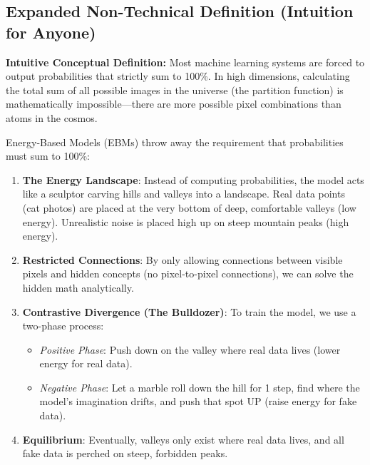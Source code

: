 \documentclass[11pt,a4paper]{article}
\theoremstyle{definition}
\begin{document}
\subsection{Expanded Non-Technical Definition (Intuition for Anyone)}
\textbf{Intuitive Conceptual Definition:}
Most machine learning systems are forced to output probabilities that strictly sum to 100\%. In high dimensions, calculating the total sum of all possible images in the universe (the partition function) is mathematically impossible—there are more possible pixel combinations than atoms in the cosmos.

Energy-Based Models (EBMs) throw away the requirement that probabilities must sum to 100\%:
\begin{enumerate}
    \item \textbf{The Energy Landscape}: Instead of computing probabilities, the model acts like a sculptor carving hills and valleys into a landscape. Real data points (cat photos) are placed at the very bottom of deep, comfortable valleys (low energy). Unrealistic noise is placed high up on steep mountain peaks (high energy).
    \item \textbf{Restricted Connections}: By only allowing connections between visible pixels and hidden concepts (no pixel-to-pixel connections), we can solve the hidden math analytically.
    \item \textbf{Contrastive Divergence (The Bulldozer)}: To train the model, we use a two-phase process:
    \begin{itemize}
        \item \emph{Positive Phase}: Push down on the valley where real data lives (lower energy for real data).
        \item \emph{Negative Phase}: Let a marble roll down the hill for 1 step, find where the model's imagination drifts, and push that spot UP (raise energy for fake data).
    \end{itemize}
    \item \textbf{Equilibrium}: Eventually, valleys only exist where real data lives, and all fake data is perched on steep, forbidden peaks.
\end{enumerate}
\end{document}

